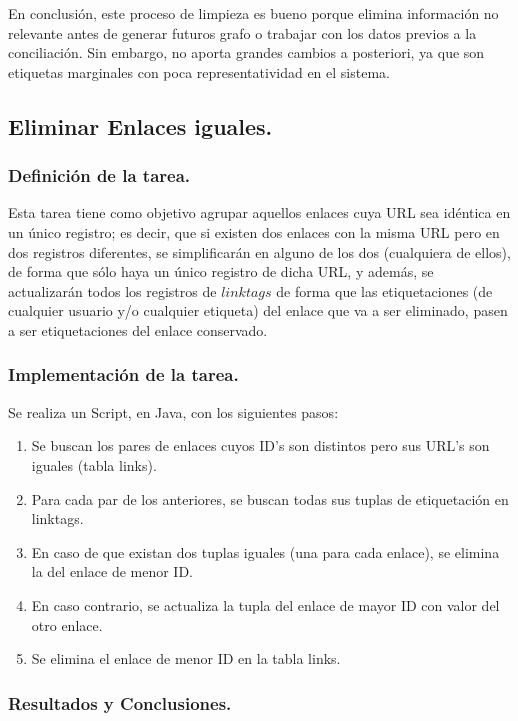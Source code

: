 En conclusión, este proceso de limpieza es bueno porque elimina información no relevante antes de generar futuros grafo o trabajar con los datos previos a la conciliación. Sin embargo, no aporta grandes cambios a posteriori, ya que son etiquetas marginales con poca representatividad en el sistema.

\subsection{Eliminar Enlaces iguales.}

\subsubsection{Definición de la tarea.}

Esta tarea tiene como objetivo agrupar aquellos enlaces cuya URL sea idéntica en un único registro; es decir, que si existen dos enlaces con la misma URL pero en dos registros diferentes, se simplificarán en alguno de los dos (cualquiera de ellos), de forma que sólo haya un único registro de dicha URL, y además, se actualizarán todos los registros de $linktags$ de forma que las etiquetaciones (de cualquier usuario y/o cualquier etiqueta) del enlace que va a ser eliminado, pasen a ser etiquetaciones del enlace conservado.

\subsubsection{Implementación de la tarea.}

Se realiza un Script, en Java, con los siguientes pasos:
\begin{enumerate}
\item    Se buscan los pares de enlaces cuyos ID’s son distintos pero sus URL’s son iguales (tabla links).
\item    Para cada par de los anteriores, se buscan todas sus tuplas de etiquetación en linktags.
\item    En caso de que existan dos tuplas iguales (una para cada enlace), se elimina la del enlace de menor ID.
\item    En caso contrario, se actualiza la tupla del enlace de mayor ID con valor del otro enlace.
\item    Se elimina el enlace de menor ID en la tabla links.
\end{enumerate}


\subsubsection{Resultados y Conclusiones.}

